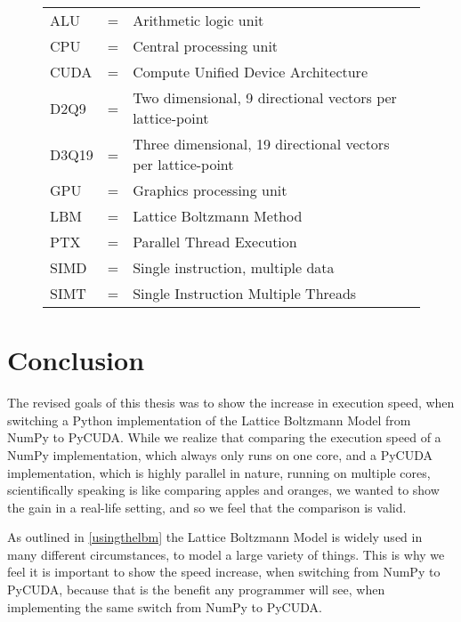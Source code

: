 \begin{figure}[htb]
\centering
	\begin{tabular}{lcl}
		ALU & = & Arithmetic logic unit\\
		CPU & = & Central processing unit\\
		CUDA & = & Compute Unified Device Architecture\\
		D2Q9 & = & Two dimensional, 9 directional vectors per lattice-point\\
		D3Q19 & = & Three dimensional, 19 directional vectors per lattice-point\\
		GPU & = & Graphics processing unit\\
		LBM & = & Lattice Boltzmann Method\\
		PTX & = & Parallel Thread Execution\\
		SIMD & = & Single instruction, multiple data\\
		SIMT & = & Single Instruction Multiple Threads
	\end{tabular}
\end{figure}

\newpage


\newpage


\newpage


\newpage


\newpage
\section{Conclusion}

The revised goals of this thesis was to show the increase in execution speed, when switching a Python implementation of the Lattice Boltzmann Model from NumPy to PyCUDA. While we realize that comparing the execution speed of a NumPy implementation, which always only runs on one core, and a PyCUDA implementation, which is highly parallel in nature, running on multiple cores, scientifically speaking is like comparing apples and oranges, we wanted to show the gain in a real-life setting, and so we feel that the comparison is valid.

As outlined in \autoref{usingthelbm} the Lattice Boltzmann Model is widely used in many different circumstances, to model a large variety of things. This is why we feel it is important to show the speed increase, when switching from NumPy to PyCUDA, because that is the benefit any programmer will see, when implementing the same switch from NumPy to PyCUDA.

